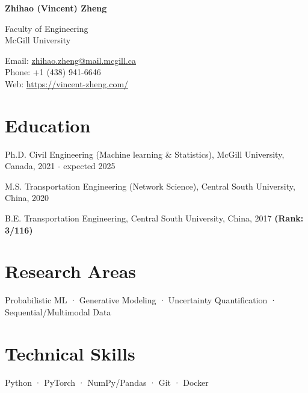 \documentclass[12pt,letterpaper]{report}
\newcommand{\myname}{Zhihao (Vincent) Zheng}
\newcommand{\namefont}[1]{{\normalfont\bfseries\Huge{#1}}}
\begin{document}
    \raggedright

    \namefont{\myname}

    \vspace{1em}
    \begin{minipage}[t]{0.64\textwidth}
        Faculty of Engineering \\
        McGill University
    \end{minipage}
    \begin{minipage}[t]{0.35\textwidth}
        Email: \href{mailto:zhihao.zheng@mail.mcgill.ca}{zhihao.zheng@mail.mcgill.ca} \\
        Phone: +1 (438) 941-6646 \\
        Web: \href{https://vincent-zheng.com/}{https://vincent-zheng.com/}
    \end{minipage}
    \vspace{0.5em}

    \section*{Education}
    \begin{tablist}
        \item[Ph.D.] \tab Civil Engineering (Machine learning \& Statistics), McGill University, Canada, 2021 - expected 2025
        \item {}
        \item[M.S.]  \tab Transportation Engineering (Network Science), Central South University, China, 2020
        \item {}
        \item[B.E.]  \tab Transportation Engineering, Central South University, China, 2017 \textbf{(Rank: 3/116)}
    \end{tablist}

    \section*{Research Areas}
    Probabilistic ML · Generative Modeling · Uncertainty Quantification · Sequential/Multimodal Data

    \section*{Technical Skills}
    Python · PyTorch · NumPy/Pandas · Git · Docker
\end{document}
